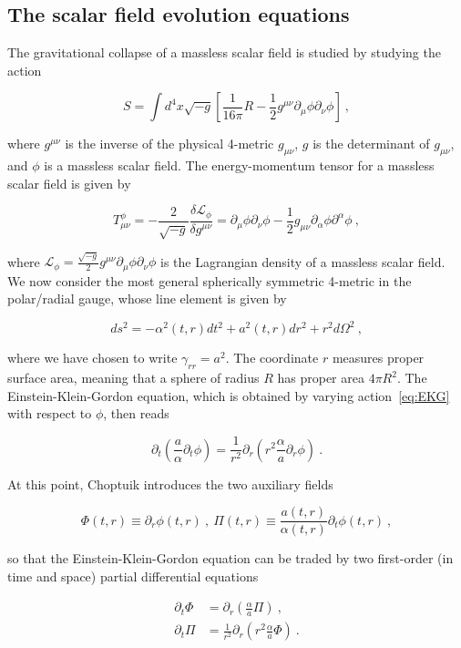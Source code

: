 \documentclass[a4paper,11pt]{article}
\renewcommand{\a}{\alpha}
\renewcommand{\d}{\delta}
\newcommand{\g}{\gamma}
\newcommand{\gDD}[2]{\g_{{#1}{#2}}}
\newcommand{\GDD}[2]{g_{{#1}{#2}}}
\newcommand{\GUU}[2]{g^{{#1}{#2}}}
\newcommand{\sqrtGdet}{\sqrt{-g}}
\newcommand{\pd}{\partial}
\renewcommand{\L}{\mathcal{L}}
\newcommand{\lrpar}[1]{\left( #1 \right)}
\newcommand{\lrsquare}[1]{\left[ #1 \right]}
\newcommand{\n}{\noindent}
\newcommand{\eq}[1]{
  \begin{equation}
    #1
  \end{equation}
}
\newcommand{\al}[1]{
  \begin{align}
    #1
  \end{align}
}
\begin{document}
\subsection{The scalar field evolution equations}

The gravitational collapse of a massless scalar field is studied by studying the action

\eq{S = \int d^{4}x \sqrtGdet \lrsquare{\frac{1}{16\pi}R - \frac{1}{2}\GUU{\mu}{\nu}\pd_{\mu}\phi\pd_{\nu}\phi}\ ,\label{eq:EKG}}

\n where $\GUU{\mu}{\nu}$ is the inverse of the physical 4-metric $\GDD{\mu}{\nu}$, $g$ is the determinant of $\GDD{\mu}{\nu}$, and $\phi$ is a massless scalar field. The energy-momentum tensor for a massless scalar field is given by

\eq{ T^{\phi}_{\mu\nu} = -\frac{2}{\sqrtGdet}\frac{\d\L_{\phi}}{\d\GUU{\mu}{\nu}} = \pd_{\mu}\phi\pd_{\nu}\phi - \frac{1}{2}\GDD{\mu}{\nu}\pd_{\a}\phi\pd^{\a}\phi\ , }

\n where $\L_{\phi} = \frac{\sqrtGdet}{2}\GUU{\mu}{\nu}\pd_{\mu}\phi\pd_{\nu}\phi$ is the Lagrangian density of a massless scalar field. We now consider the most general spherically symmetric 4-metric in the polar/radial gauge, whose line element is given by

\eq{ ds^{2} = -\a^{2}\lrpar{t,r}dt^{2} + a^{2}\lrpar{t,r}dr^{2} + r^{2}d\Omega^{2}\ , }

\n where we have chosen to write $\gDD{r}{r} = a^{2}$. The coordinate $r$ measures proper surface area, meaning that a sphere of radius $R$ has proper area $4\pi R^{2}$. The Einstein-Klein-Gordon equation, which is obtained by varying action~\eqref{eq:EKG} with respect to $\phi$, then reads

\eq{ \pd_{t}\lrpar{\frac{a}{\a}\pd_{t}\phi} = \frac{1}{r^{2}}\pd_{r}\lrpar{r^{2}\frac{\a}{a}\pd_{r}\phi}\ . }

\n At this point, Choptuik introduces the two auxiliary fields

\eq{ \Phi\lrpar{t,r} \equiv \pd_{r}\phi\lrpar{t,r}\ ,\ \Pi\lrpar{t,r} \equiv \frac{a\lrpar{t,r}}{\a\lrpar{t,r}}\pd_{t}\phi\lrpar{t,r}\ , }

\n so that the Einstein-Klein-Gordon equation can be traded by two first-order (in time and space) partial differential equations

\al{
  \pd_{t}\Phi &= \pd_{r}\lrpar{\frac{\a}{a}\Pi}\ , \label{eq:chop1}\\
  \pd_{t}\Pi  &= \frac{1}{r^{2}}\pd_{r}\lrpar{r^{2}\frac{\a}{a}\Phi} \label{eq:chop2}\ .
}
\end{document}
